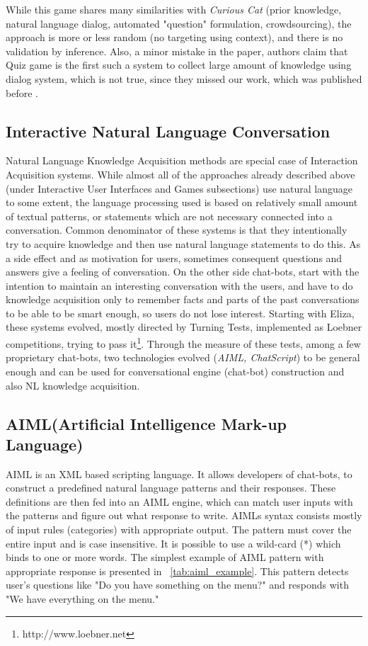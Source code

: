 While this game shares many similarities with \emph{Curious Cat} (prior 
knowledge, natural language dialog, automated "question" formulation,
crowdsourcing), the approach is more or less random (no targeting using context),
and there is no validation by inference. Also, a minor mistake in the paper,
authors claim that Quiz game is the first such a system to collect large amount
of knowledge using dialog system, which is not true, since they missed our
 work, which was published before \parencite{Bradesko2016}.

\subsection{Interactive Natural Language Conversation}
\label{section:r:inlc}
Natural Language Knowledge Acquisition methods are special case of Interaction 
Acquisition systems. While almost all of the approaches already described above
(under Interactive User Interfaces and Games subsections) use natural language 
to some extent, the language processing used is based on relatively small amount
of textual patterns, or statements which are not necessary connected into a 
conversation. Common denominator of these systems is that they intentionally try
to acquire knowledge and then use natural language statements to do this. As a 
side effect and as motivation for users, sometimes consequent questions and 
answers give a feeling of conversation. On the other side chat-bots, start with
the intention to maintain an interesting conversation with the users, and have 
to do knowledge acquisition only to remember facts and parts of the past 
conversations to be able to be smart enough, so users do not lose interest.
Starting with Eliza\parencite{Weizenbaum1966}, these systems evolved, mostly 
directed by Turning Tests\parencite{Turing?}, implemented as Loebner 
competitions, trying to pass it\footnote{http://www.loebner.net}. Through the 
measure of these tests\parencite{Bradesko2012}, among a few proprietary 
chat-bots, two technologies evolved (\emph{AIML, ChatScript}) to be general 
enough and can be used for conversational engine (chat-bot) construction and 
also NL knowledge acquisition.

\subsection{AIML(Artificial Intelligence Mark-up Language)}
\label{section:r:aiml}
AIML is an XML based 
scripting language. It allows developers of chat-bots, to construct a predefined
natural language patterns and their responses. These definitions are 
then fed into an AIML engine, which can match user inputs with the patterns and 
figure out what response to write. AIMLs syntax consists mostly of input rules 
(categories) with appropriate output. The pattern must cover the entire input 
and is case insensitive. It is possible to use a wild-card (*) which binds to 
one or more words. The simplest example of AIML pattern with appropriate 
response is presented in \tablename~\ref{tab:aiml_example}. This pattern 
detects user's questions like "Do you have something on the menu?" and responds 
with "We have everything on the menu."

